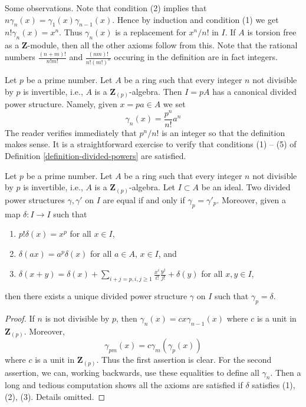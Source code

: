 \noindent
Some observations. Note that condition (2) implies that
$n \gamma_n(x) = \gamma_1(x)\gamma_{n - 1}(x)$. Hence by induction
and condition (1) we get $n! \gamma_n(x) = x^n$. Thus $\gamma_n(x)$
is a replacement for $x^n/n!$ in $I$. If $A$ is torsion free as a
$\mathbf{Z}$-module, then all the other axioms follow from this. 
Note that the rational numbers $\frac{(n + m)!}{n! m!}$ and
$\frac{(nm)!}{n! (m!)^n}$ occuring in the definition are in fact integers.

\begin{example}
\label{example-ideal-generated-by-p}
Let $p$ be a prime number.
Let $A$ be a ring such that every integer $n$ not divisible by $p$
is invertible, i.e., $A$ is a $\mathbf{Z}_{(p)}$-algebra. Then
$I = pA$ has a canonical divided power structure. Namely, given
$x = pa \in A$ we set
$$
\gamma_n(x) = \frac{p^n}{n!} a^n
$$
The reader verifies immediately that $p^n/n!$ is an integer so that
the definition makes sense. It is a straightforward exercise to
verify that conditions (1) -- (5) of
Definition \ref{definition-divided-powers} are satisfied.
\end{example}

\begin{lemma}
\label{lemma-need-only-gamma-p}
Let $p$ be a prime number. Let $A$ be a ring such that every integer $n$
not divisible by $p$ is invertible, i.e., $A$ is a $\mathbf{Z}_{(p)}$-algebra.
Let $I \subset A$ be an ideal. Two divided power structures
$\gamma, \gamma'$ on $I$ are equal if and only if $\gamma_p = \gamma'_p$.
Moreover, given a map $\delta : I \to I$ such that
\begin{enumerate}
\item $p!\delta(x) = x^p$ for all $x \in I$,
\item $\delta(ax) = a^p\delta(x)$ for all $a \in A$, $x \in I$, and
\item
$\delta(x + y) =
\delta(x) +
\sum\nolimits_{i + j = p, i,j \geq 1} \frac{x^i}{i!}\frac{y^j}{j!} +
\delta(y)$ for all $x, y \in I$,
\end{enumerate}
then there exists a unique divided power structure $\gamma$ on $I$ such
that $\gamma_p = \delta$.
\end{lemma}

\begin{proof}
If $n$ is not divisible by $p$, then $\gamma_n(x) = c x \gamma_{n - 1}(x)$
where $c$ is a unit in $\mathbf{Z}_{(p)}$. Moreover,
$$
\gamma_{pm}(x) = c \gamma_m(\gamma_p(x))
$$
where $c$ is a unit in $\mathbf{Z}_{(p)}$. Thus the first assertion is clear.
For the second assertion, we can, working backwards, use these equalities
to define all $\gamma_n$. Then a long and tedious computation shows all
the axioms are satisfied if $\delta$ satisfies (1), (2), (3).
Details omitted.
\end{proof}

